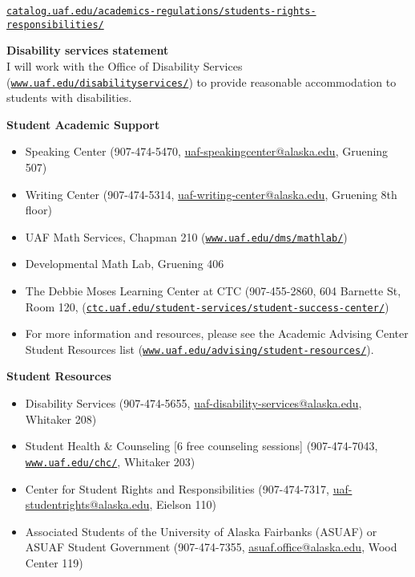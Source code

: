 \documentclass[12pt]{article}
\renewcommand{\emph}[1]{\textsf{\textbf{#1}}}
\def\mailto#1{\href{mailto:#1}{#1}}
\newcommand{\localhead}[1]{\par\smallskip\textbf{#1} \smallskip\nobreak\\}%
\def\subheading#1{\localhead{\emph{#1}}}
\begin{document}
\href{https://catalog.uaf.edu/academics-regulations/students-rights-responsibilities/}{\texttt{catalog.uaf.edu/academics-regulations/students-rights-responsibilities/}}

\subheading{Disability services statement}
I will work with the Office of Disability Services (\href{https://www.uaf.edu/disabilityservices/}{\texttt{www.uaf.edu/disabilityservices/}}) to provide reasonable accommodation to students with disabilities.


\clearpage\newpage
\phantom{foo}

\subheading{Student Academic Support}

\vspace{-7mm}
\begin{itemize}
\item Speaking Center (907-474-5470, \mailto{uaf-speakingcenter@alaska.edu}, Gruening 507)
\item Writing Center (907-474-5314, \mailto{uaf-writing-center@alaska.edu}, Gruening 8th floor)
\item UAF Math Services, Chapman 210 (\href{http://www.uaf.edu/dms/mathlab/}{\texttt{www.uaf.edu/dms/mathlab/}})
\item Developmental Math Lab, Gruening 406
\item The Debbie Moses Learning Center at CTC (907-455-2860, 604 Barnette St, Room 120, (\href{https://www.ctc.uaf.edu/student-services/student-success-center/}{\texttt{ctc.uaf.edu/student-services/student-success-center/}})
\item For more information and resources, please see the Academic Advising Center Student Resources list (\href{https://www.uaf.edu/advising/student-resources/}{\texttt{www.uaf.edu/advising/student-resources/}}).
\end{itemize}

\subheading{Student Resources}

\vspace{-7mm}
\begin{itemize}
\item Disability Services (907-474-5655, \mailto{uaf-disability-services@alaska.edu}, Whitaker 208)
\item Student Health \& Counseling [6 free counseling sessions] (907-474-7043, \href{https://www.uaf.edu/chc/}{\texttt{www.uaf.edu/chc/}}, Whitaker 203)
\item Center for Student Rights and Responsibilities (907-474-7317, \mailto{uaf-studentrights@alaska.edu}, Eielson 110)
\item Associated Students of the University of Alaska Fairbanks (ASUAF) or ASUAF Student Government (907-474-7355, \mailto{asuaf.office@alaska.edu}, Wood Center 119)
\end{itemize}
\end{document}

